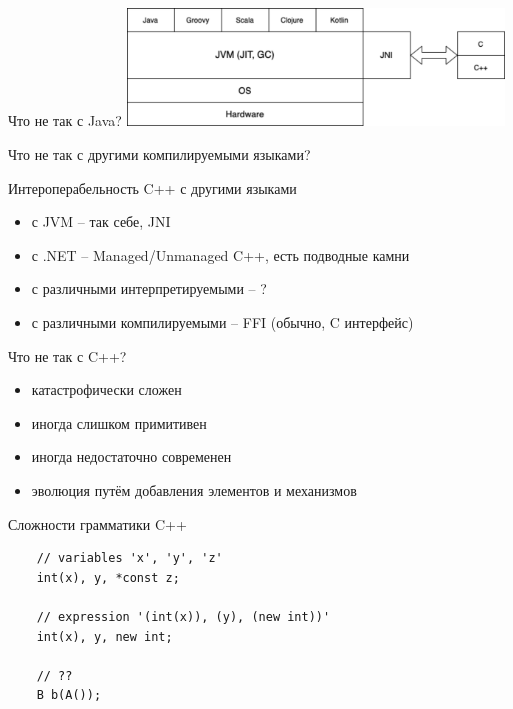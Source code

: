 \documentclass[unknownkeysallowed,xcolor=table]{beamer}
\begin{document}
\begin{frame}{Что не так с Java?}
  \includegraphics[align=c,width=10cm,keepaspectratio]{images/JVM.png}
\end{frame}

\begin{frame}{Что не так с другими компилируемыми языками?}
\end{frame}

\begin{frame}{Интероперабельность C++ с другими языками}
  \begin{itemize}
    \item с JVM -- так себе, JNI \vspace{1em}
    \item с .NET -- Managed/Unmanaged C++, есть подводные камни \vspace{1em}
    \item с различными интерпретируемыми -- ? \vspace{1em}
    \item с различными компилируемыми -- FFI (обычно, C интерфейс)
  \end{itemize}
\end{frame}

\begin{frame}{Что не так с C++?}
  \begin{itemize}
    \item катастрофически сложен \vspace{1em}
    \item иногда слишком примитивен \vspace{1em}
    \item иногда недостаточно современен \vspace{1em}
    \item эволюция путём добавления элементов и механизмов
  \end{itemize}
\end{frame}

\begin{frame}[fragile]{Сложности грамматики C++}
  \begin{lstlisting}
    // variables 'x', 'y', 'z'
    int(x), y, *const z;

    // expression '(int(x)), (y), (new int))'
    int(x), y, new int;

    // ??
    B b(A());
  \end{lstlisting}
\end{frame}
\end{document}
